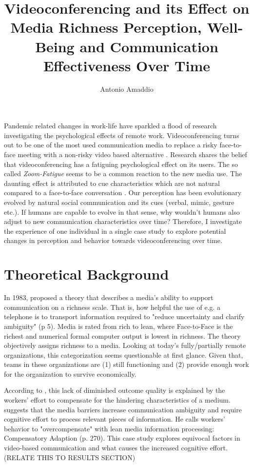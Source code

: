 \documentclass[man]{apa7}
\title{Videoconferencing and its Effect on Media Richness Perception, Well-Being and Communication Effectiveness Over Time}
\author{Antonio Amaddio}
\affiliation{Freie Universität Berlin \\ A\&O Vertiefung, Winter 2022/23, Supervisor: Dr. Lisa Handke}
\begin{document}
\maketitle
Pandemic related changes in work-life have sparkled a flood of research investigating the psychological effects of remote work. Videoconferencing turns out to be one of the most used communication media to replace a risky face-to-face meeting with a non-risky video based alternative \parencite{Riedl2021}.  Research shares the belief that videoconferencing has a fatiguing psychological effect on its users. The so called \textit{Zoom-Fatigue} seems to be a common reaction to the new media use. The daunting effect is attributed to cue characteristics which are not natural compared to a face-to-face conversation \parencite{Riedl2021}. Our perception has been evolutionary evolved by natural social communication and its cues (verbal, mimic, gesture etc.). If humans are capable to evolve in that sense, why wouldn't humans also adjust to new communication characteristics over time? Therefore, I investigate the experience of one individual in a single case study to explore potential changes in perception and behavior towards videoconferencing over time.

\section{Theoretical Background}

In 1983, \citeauthor{daft1983information} proposed a theory that describes a media's ability to support communication on a richness scale. That is, how helpful the use of e.g. a telephone is to transport information required to "reduce uncertainty and clarify ambiguity" (p 5). Media is rated from rich to lean, where Face-to-Face is the richest and numerical formal computer output is lowest in richness. The theory objectively assigns richness to a media. Looking at today's fully/partially remote organizations, this categorization seems questionable at first glance. Given that, teams in these organizations are (1) still functioning and (2) provide enough work for the organization to survive economically.

According to \citeauthor{Kock2005}, this lack of diminished outcome quality is explained by the workers' effort to compensate for the hindering characteristics of a medium. \citeauthor{Kock2005} suggests that the media barriers increase communication ambiguity and require cognitive effort to process relevant pieces of information. He calls workers' behavior to "overcompensate" with lean media information processing: Compensatory Adaption (p. 270). This case study explores equivocal factors in video-based communication and what causes the increased cognitive effort. (RELATE THIS TO RESULTS SECTION)
\end{document}
